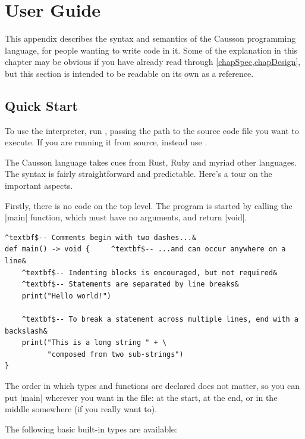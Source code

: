 \documentclass[11pt]{report}
\begin{document}
\endgroup


\chapter{User Guide} \label{adxGuide}

This appendix describes the syntax and semantics of the Causson programming language, for people wanting to write code in it. Some of the explanation in this chapter may be obvious if you have already read through \cref{chapSpec,chapDesign}, but this section is intended to be readable on its own as a reference.

\section{Quick Start}

To use the interpreter, run , passing the path to the source code file you want to execute. If you are running it from source, instead use .

The Causson language takes cues from Rust, Ruby and myriad other languages. The syntax is fairly straightforward and predictable. Here's a tour on the important aspects.

Firstly, there is no code on the top level. The program is started by calling the |main| function, which must have no arguments, and return |void|.

\begin{Verbatim}[commandchars=^$&]
^textbf$-- Comments begin with two dashes...&
def main() -> void {     ^textbf$-- ...and can occur anywhere on a line&
    ^textbf$-- Indenting blocks is encouraged, but not required&
    ^textbf$-- Statements are separated by line breaks&
    print("Hello world!")
    
    ^textbf$-- To break a statement across multiple lines, end with a backslash&
    print("This is a long string " + \
          "composed from two sub-strings")
}
\end{Verbatim}

The order in which types and functions are declared does not matter, so you can put |main| wherever you want in the file: at the start, at the end, or in the middle somewhere (if you really want to).

The following basic built-in types are available:
\end{document}
